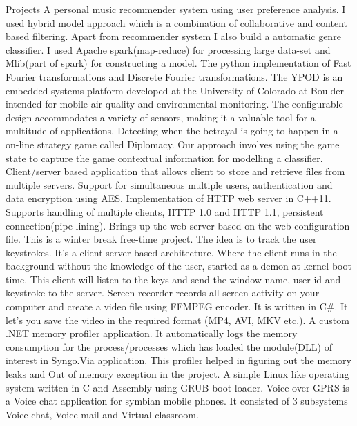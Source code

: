 \documentclass{resume}
\begin{document}
\begin{category}{Projects}
 A personal music recommender system using user preference analysis. I used hybrid model approach which is a combination of collaborative and content based filtering. Apart from recommender system I also build a automatic genre classifier. I used Apache spark(map-reduce) for processing large data-set and Mlib(part of spark) for constructing a model.
 The python implementation of Fast Fourier transformations and Discrete Fourier transformations.
 The YPOD is an embedded-systems platform developed at the University of Colorado at Boulder intended for mobile air quality and environmental monitoring. The configurable design accommodates a variety of sensors, making it a valuable tool for a multitude of applications.
 Detecting when the betrayal is going to happen in a on-line strategy game called Diplomacy. Our approach involves using the game state to capture the game contextual information for modelling a classifier.
 Client/server based application that allows client to store and retrieve files from multiple servers. Support for simultaneous multiple users, authentication and data encryption using AES.
 Implementation of HTTP web server in C++11. Supports handling of multiple clients, HTTP 1.0 and HTTP 1.1, persistent connection(pipe-lining). Brings up the web server based on the web configuration file.
 This is a winter break free-time project. The idea is to track the user keystrokes. It's a client server based architecture. Where the client runs in the background without the knowledge of the user, started as a demon at kernel boot time. This client will listen to the keys and send the window name, user id and keystroke to the server.
 Screen recorder records all screen activity on your computer and create a video file using FFMPEG encoder. It is written in C\#. It let's you save the video in the required format (MP4, AVI, MKV etc.).
 A custom .NET memory profiler application. It automatically logs the memory consumption for the process/processes which has loaded the module(DLL) of interest in Syngo.Via application. This profiler helped in figuring out the memory leaks and Out of memory exception in the project.
 A simple Linux like operating system written in C and Assembly using GRUB boot loader.
 Voice over GPRS is a Voice chat application for symbian mobile phones. It consisted of 3 subsystems Voice chat, Voice-mail and Virtual classroom.
\end{category}
\end{document}
